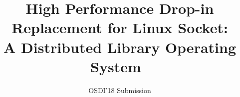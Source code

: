 \documentclass[letterpaper,twocolumn,10pt]{article}
\begin{document}
\title{High Performance Drop-in Replacement for Linux Socket:\\ A Distributed Library Operating System~\vspace{-0.1in}}

\author{{\rm OSDI'18 Submission}\vspace{-0.5in}}

\newcommand{\authornote}[1]{\raisebox{0.8ex}{$#1$}}
\maketitle

\newcommand{\specialcell}[2][c]{%
  \begin{tabular}[#1]{@{}c@{}}#2\end{tabular}}











\balance


\end{document}

